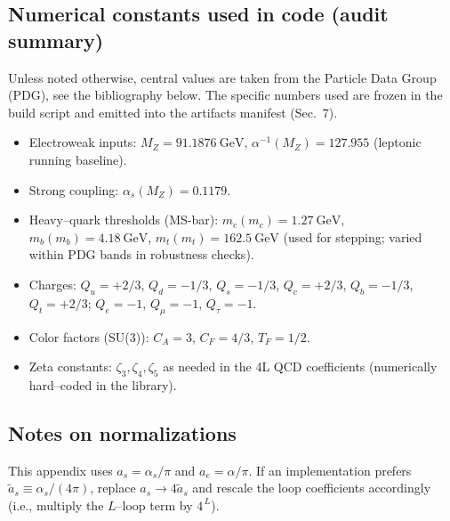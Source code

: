 \documentclass[aps,prd,onecolumn,amsmath,amssymb,superscriptaddress,nofootinbib,showpacs,showkeys]{revtex4-2}
\begin{document}
\subsection{ Numerical constants used in code (audit summary)}
Unless noted otherwise, central values are taken from the Particle Data Group (PDG), see the bibliography below. The specific numbers used are frozen in the build script and emitted into the artifacts manifest (Sec.~7).
\begin{itemize}
\item Electroweak inputs: $M_Z=91.1876~\mathrm{GeV}$, $\alpha^{-1}(M_Z)=127.955$ (leptonic running baseline).
\item Strong coupling: $\alpha_s(M_Z)=0.1179$.
\item Heavy–quark thresholds (MS-bar): $m_c(m_c)=1.27~\mathrm{GeV}$, $m_b(m_b)=4.18~\mathrm{GeV}$, $m_t(m_t)=162.5~\mathrm{GeV}$ (used for stepping; varied within PDG bands in robustness checks).
\item Charges: $Q_u=+2/3$, $Q_d=-1/3$, $Q_s=-1/3$, $Q_c=+2/3$, $Q_b=-1/3$, $Q_t=+2/3$; $Q_e=-1$, $Q_\mu=-1$, $Q_\tau=-1$.
\item Color factors (SU(3)): $C_A=3$, $C_F=4/3$, $T_F=1/2$.
\item Zeta constants: $\zeta_3, \zeta_4, \zeta_5$ as needed in the 4L QCD coefficients (numerically hard–coded in the library).
\end{itemize}

\subsection{ Notes on normalizations}
This appendix uses $a_s=\alpha_s/\pi$ and $a_e=\alpha/\pi$. If an implementation prefers $\tilde a_s\equiv\alpha_s/(4\pi)$, replace $a_s\to 4\tilde a_s$ and rescale the loop coefficients accordingly (i.e., multiply the $L$–loop term by $4^{\,L}$).


\newpage  \clearpage  %
\end{document}
